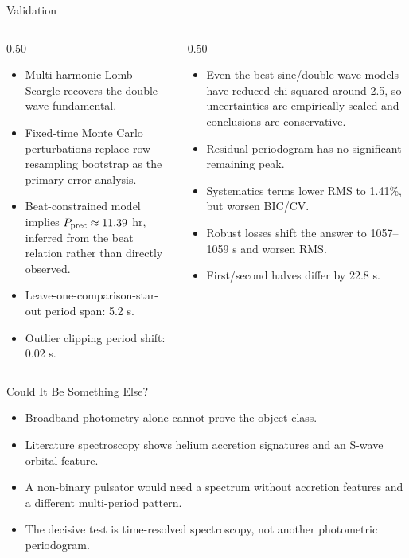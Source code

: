 \documentclass[aspectratio=169]{beamer}
\begin{document}
\begin{frame}{Validation}
  \small
  \begin{columns}
    \begin{column}{0.50\textwidth}
      \begin{itemize}
        \item Multi-harmonic Lomb-Scargle recovers the double-wave fundamental.
        \item Fixed-time Monte Carlo perturbations replace row-resampling bootstrap as the primary error analysis.
        \item Beat-constrained model implies \(P_{\rm prec}\approx 11.39\) hr, inferred from the beat relation rather than directly observed.
        \item Leave-one-comparison-star-out period span: 5.2 s.
        \item Outlier clipping period shift: 0.02 s.
      \end{itemize}
    \end{column}
    \begin{column}{0.50\textwidth}
      \begin{itemize}
        \item Even the best sine/double-wave models have reduced chi-squared around 2.5, so uncertainties are empirically scaled and conclusions are conservative.
        \item Residual periodogram has no significant remaining peak.
        \item Systematics terms lower RMS to 1.41\%, but worsen BIC/CV.
        \item Robust losses shift the answer to 1057--1059 s and worsen RMS.
        \item First/second halves differ by 22.8 s.
      \end{itemize}
    \end{column}
  \end{columns}
\end{frame}

\begin{frame}{Could It Be Something Else?}
  \begin{itemize}
    \item Broadband photometry alone cannot prove the object class.
    \item Literature spectroscopy shows helium accretion signatures and an S-wave orbital feature.
    \item A non-binary pulsator would need a spectrum without accretion features and a different multi-period pattern.
    \item The decisive test is time-resolved spectroscopy, not another photometric periodogram.
  \end{itemize}
\end{frame}
\end{document}
